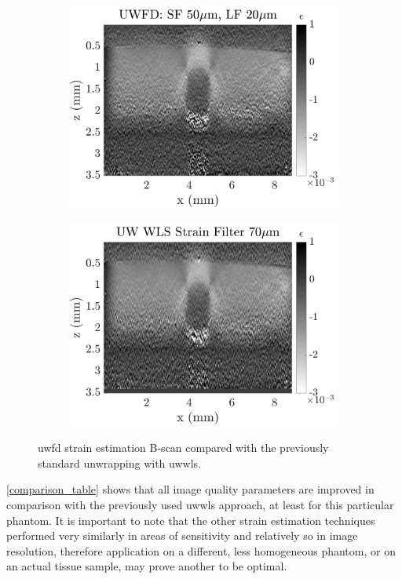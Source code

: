 \begin{figure}
	\centering
	\begin{subfigure}{0.49\textwidth}
		\centering
		\includegraphics[width=\textwidth]{figures/uwfd_compare.png}
	\end{subfigure}
	\begin{subfigure}{0.49\textwidth}
		\centering
		\includegraphics[width=\textwidth]{figures/wls_compare.png}
	\end{subfigure}
	\caption{\ac{uwfd} strain estimation B-scan compared with the previously standard unwrapping with \ac{uwwls}.}
	\label{wls_uwfd_compare}
\end{figure}

\autoref{comparison_table} shows that all image quality parameters are improved in comparison with the previously used \ac{uwwls} approach, at least for this particular phantom. It is important to note that the other strain estimation techniques performed very similarly in areas of sensitivity and relatively so in image resolution, therefore application on a different, less homogeneous phantom, or on an actual tissue sample, may prove another to be optimal.

